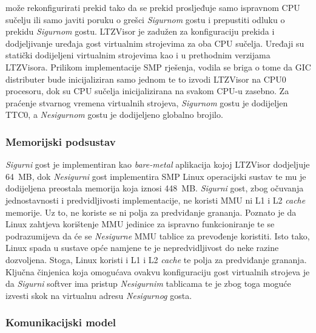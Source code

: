 \documentclass[times, utf8, diplomski, numeric]{fer}
\begin{document}
može rekonfigurirati prekid tako da se prekid prosljeđuje samo ispravnom CPU sučelju ili samo javiti poruku o grešci
\textit{Sigurnom} gostu i prepustiti odluku o prekidu \textit{Sigurnom} gostu. LTZVisor je zadužen za konfiguraciju prekida
i dodjeljivanje uređaja gost virtualnim strojevima za oba CPU sučelja. Uređaji su statički dodijeljeni virtualnim strojevima
kao i u prethodnim verzijama LTZVisora. Prilikom implementacije SMP rješenja, vodila se briga
o tome da GIC distributer bude inicijaliziran samo jednom te to izvodi LTZVisor na CPU0 procesoru, dok su CPU sučelja
inicijalizirana na svakom CPU-u zasebno. Za praćenje stvarnog vremena virtualnih strojeva, \textit{Sigurnom} gostu je
dodijeljen TTC0, a \textit{Nesigurnom} gostu je dodijeljeno globalno brojilo.

\subsubsection{Memorijski podsustav}
\textit{Sigurni} gost je implementiran kao \textit{bare-metal} aplikacija kojoj LTZVisor dodjeljuje 64~MB, dok
\textit{Nesigurni} gost implementira SMP Linux operacijski sustav te mu je dodijeljena preostala memorija koja iznosi 448~MB.
\textit{Sigurni} gost, zbog očuvanja jednostavnosti i predvidljivosti implementacije, ne koristi MMU ni L1 i L2 \textit{cache}
memorije. Uz to, ne koriste se ni polja za predviđanje grananja. Poznato je da Linux zahtjeva korištenje MMU jedinice za
ispravno funkcioniranje te se podrazumijeva da će se \textit{Nesigurne} MMU tablice za prevođenje koristiti. Isto tako, Linux
spada u sustave opće namjene te je nepredvidljivost do neke razine dozvoljena. Stoga, Linux koristi i L1 i L2 \textit{cache} te
polja za predviđanje grananja. Ključna činjenica koja omogućava ovakvu konfiguraciju gost virtualnih strojeva je da
\textit{Sigurni} softver ima pristup \textit{Nesigurnim} tablicama te je zbog toga moguće izvesti skok na virtualnu adresu
\textit{Nesigurnog} gosta.

\subsubsection{Komunikacijski model}
\end{document}
